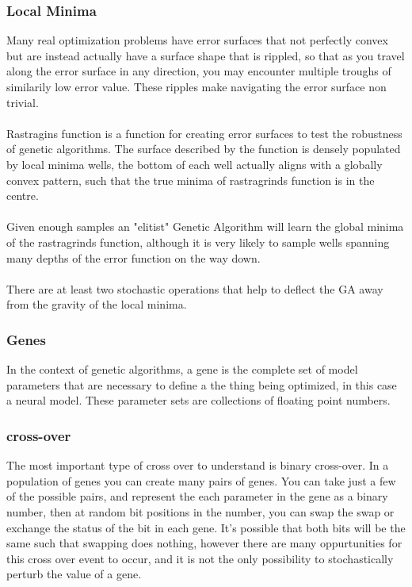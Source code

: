 
\subsubsection{Local Minima} Many real optimization problems have error surfaces that not perfectly convex but are instead actually have a surface shape that is rippled, so that as you travel along the error surface in any direction, you may encounter multiple troughs of similarily low error value. These ripples make navigating the error surface non trivial.\\ 
\\
Rastragins function is a function for creating error surfaces to test the robustness of genetic algorithms. The surface described by the function is densely populated by local minima wells, the bottom of each well actually aligns with a globally convex pattern, such that the true minima of rastragrinds function is in the centre.\\
\\
Given enough samples an "elitist" Genetic Algorithm will learn the global minima of the rastragrinds function, although it is very likely to sample wells spanning many depths of the error function on the way down.\\
\\
There are at least two stochastic operations that help to deflect the GA away from the gravity of the local minima.


\subsubsection{Genes}
In the context of genetic algorithms, a gene is the complete set of model parameters that are necessary to define a the thing being optimized, in this case a neural model. These parameter sets are collections of floating point numbers.
\subsubsection{cross-over}
The most important type of cross over to understand is binary cross-over. In a population of genes you can create many pairs of genes. You can take just a few of the possible pairs, and represent the each parameter in the gene as a binary number, then at random bit positions in the number, you can swap the swap or exchange the status of the bit in each gene. It's possible that both bits will be the same such that swapping does nothing, however there are many oppurtunities for this cross over event to occur, and it is not the only possibility to stochastically perturb the value of a gene.
